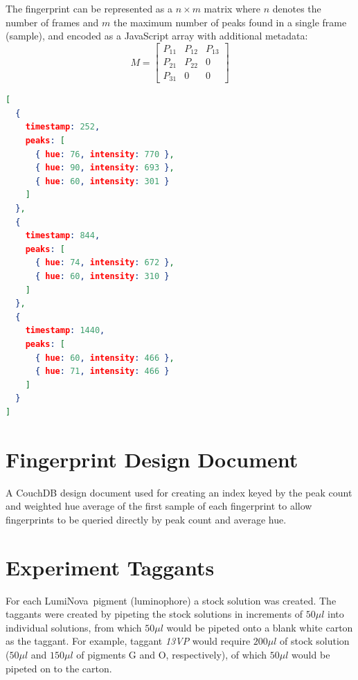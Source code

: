 \documentclass[thesis.tex]{subfiles}
\begin{document}
The fingerprint can be represented as a $n \times m$ matrix where $n$ denotes the number of frames and $m$ the maximum number of peaks found in a single frame (sample), and encoded as a JavaScript array with additional metadata:
\[
M=
  \begin{bmatrix}
    P_{11} & P_{12} & P_{13} \\
    P_{21} & P_{22} & 0 \\
    P_{31} & 0 & 0
  \end{bmatrix}
\]
\begin{lstlisting}[language=json,firstnumber=1]
[
  {
    timestamp: 252,
    peaks: [
      { hue: 76, intensity: 770 },
      { hue: 90, intensity: 693 },
      { hue: 60, intensity: 301 }
    ]
  },
  {
    timestamp: 844,
    peaks: [
      { hue: 74, intensity: 672 },
      { hue: 60, intensity: 310 }
    ]
  },
  {
    timestamp: 1440,
    peaks: [
      { hue: 60, intensity: 466 },
      { hue: 71, intensity: 466 }
    ]
  }
]
\end{lstlisting}


\chapter{Fingerprint Design Document}
\label{appendix:fingerprint-design-doc}
A CouchDB design document used for creating an index keyed by the peak count and weighted hue average of the first sample of each fingerprint to allow fingerprints to be queried directly by peak count and average hue.
\vspace{5mm}



\chapter{Experiment Taggants}
\label{appendix:taggants}

For each LumiNova\textregistered\ pigment (luminophore) a stock solution was created. The taggants were created by pipeting the stock solutions in increments of $50\mu l$ into individual solutions, from which $50\mu l$ would be pipeted onto a blank white carton as the taggant. For example, taggant \emph{13VP} would require $200\mu l$ of stock solution ($50\mu l$ and $150\mu l$ of pigments G and O, respectively), of which $50\mu l$ would be pipeted on to the carton.
\end{document}
